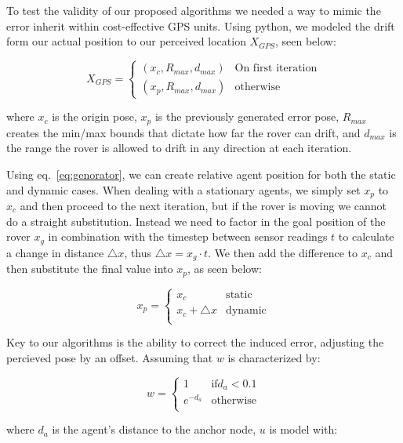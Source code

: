 To test the validity of our proposed algorithms we needed a way to mimic the error inherit within cost-effective GPS units. Using python, we modeled the drift form our actual position to our perceived location $X_{GPS}$, seen below:

\begin{equation}
	X_{GPS} = 
	\begin{cases}
	(x_c, R_{max}, d_{max}) & \text{On first iteration} \\
	(x_p, R_{max}, d_{max}) & \text{otherwise}
	\end{cases}
	\label{eq:genorator}
\end{equation}

where $x_c$ is the origin pose, $x_p$ is the previously generated error pose, $R_{max}$ creates the min/max bounds that dictate how far the rover can drift, and $d_{max}$ is the range the rover is allowed to drift in any direction at each iteration. 

Using eq.~\ref{eq:genorator}, we can create relative agent position for both the static and dynamic cases. When dealing with a stationary agents, we simply set $x_p$ to $x_c$ and then proceed to the next iteration, but if the rover is moving we cannot do a straight substitution. Instead we need to factor in the goal position of the rover $x_g$ in combination with the timestep between sensor readings $t$ to calculate a change in distance $\triangle x$, thus $\triangle x = x_g \cdot t$. We then add the difference to $x_c$ and then substitute the final value into $x_p$, as seen below:

\begin{equation}
x_p = 
	\begin{cases}
		x_c & \text{static} \\
		x_c + \triangle x & \text{dynamic}\\
	\end{cases}
	\label{eq:genorator_expln}
\end{equation}

Key to our algorithms is the ability to correct the induced error, adjusting the percieved pose by an offset. Assuming that $w$ is characterized by:

\[
w = 
\begin{cases}
	1 & \text{if} d_a < 0.1 \\
	e^{-d_a} & \text{otherwise} \\
\end{cases}
\]

where $d_a$ is the agent's distance to the anchor node,  $u$ is model with:

